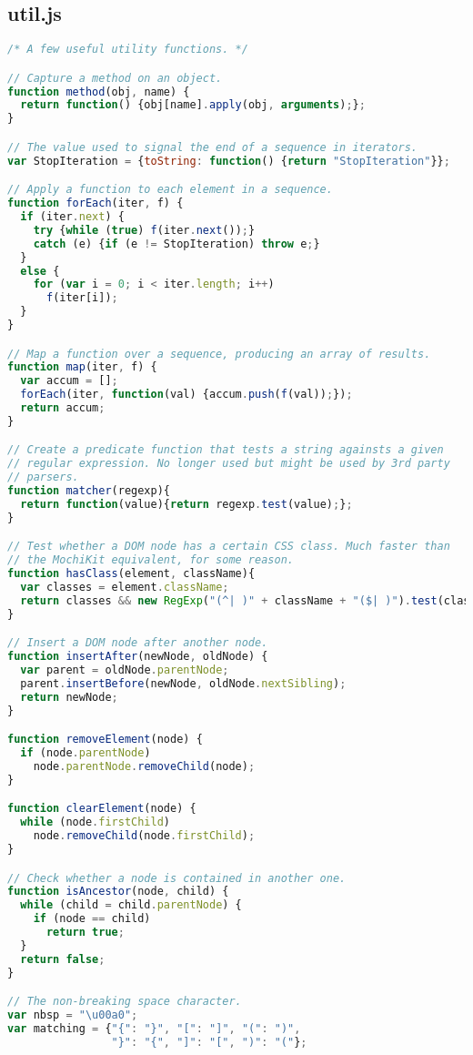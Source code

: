 \subsection{util.js}
\begin{lstlisting}[language=Javascript]
/* A few useful utility functions. */

// Capture a method on an object.
function method(obj, name) {
  return function() {obj[name].apply(obj, arguments);};
}

// The value used to signal the end of a sequence in iterators.
var StopIteration = {toString: function() {return "StopIteration"}};

// Apply a function to each element in a sequence.
function forEach(iter, f) {
  if (iter.next) {
    try {while (true) f(iter.next());}
    catch (e) {if (e != StopIteration) throw e;}
  }
  else {
    for (var i = 0; i < iter.length; i++)
      f(iter[i]);
  }
}

// Map a function over a sequence, producing an array of results.
function map(iter, f) {
  var accum = [];
  forEach(iter, function(val) {accum.push(f(val));});
  return accum;
}

// Create a predicate function that tests a string againsts a given
// regular expression. No longer used but might be used by 3rd party
// parsers.
function matcher(regexp){
  return function(value){return regexp.test(value);};
}

// Test whether a DOM node has a certain CSS class. Much faster than
// the MochiKit equivalent, for some reason.
function hasClass(element, className){
  var classes = element.className;
  return classes && new RegExp("(^| )" + className + "($| )").test(classes);
}

// Insert a DOM node after another node.
function insertAfter(newNode, oldNode) {
  var parent = oldNode.parentNode;
  parent.insertBefore(newNode, oldNode.nextSibling);
  return newNode;
}

function removeElement(node) {
  if (node.parentNode)
    node.parentNode.removeChild(node);
}

function clearElement(node) {
  while (node.firstChild)
    node.removeChild(node.firstChild);
}

// Check whether a node is contained in another one.
function isAncestor(node, child) {
  while (child = child.parentNode) {
    if (node == child)
      return true;
  }
  return false;
}

// The non-breaking space character.
var nbsp = "\u00a0";
var matching = {"{": "}", "[": "]", "(": ")",
                "}": "{", "]": "[", ")": "("};


\end{lstlisting}

